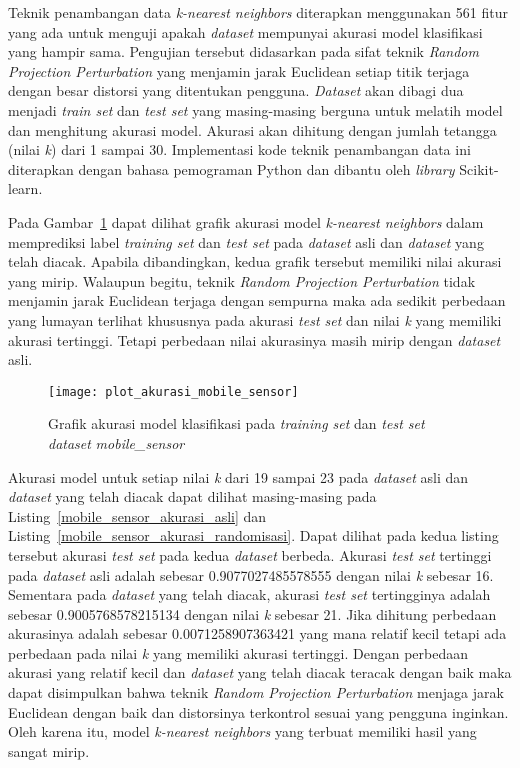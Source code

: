 Teknik penambangan data \textit{k-nearest neighbors} diterapkan menggunakan 561 fitur yang ada untuk menguji apakah \textit{dataset} mempunyai akurasi model klasifikasi yang hampir sama. Pengujian tersebut didasarkan pada sifat teknik \textit{Random Projection Perturbation} yang menjamin jarak Euclidean setiap titik terjaga dengan besar distorsi yang ditentukan pengguna. \textit{Dataset} akan dibagi dua menjadi \textit{train set} dan \textit{test set} yang masing-masing berguna untuk melatih model dan menghitung akurasi model. Akurasi akan dihitung dengan jumlah tetangga (nilai \textit{k}) dari 1 sampai 30. Implementasi kode teknik penambangan data ini diterapkan dengan bahasa pemograman Python dan dibantu oleh \textit{library} Scikit-learn.

Pada Gambar~\ref{fig:plot_akurasi_mobile_sensor} dapat dilihat grafik akurasi model \textit{k-nearest neighbors} dalam memprediksi label \textit{training set} dan \textit{test set} pada \textit{dataset} asli dan \textit{dataset} yang telah diacak. Apabila dibandingkan, kedua grafik tersebut memiliki nilai akurasi yang mirip. Walaupun begitu, teknik \textit{Random Projection Perturbation} tidak menjamin jarak Euclidean terjaga dengan sempurna maka ada sedikit perbedaan yang lumayan terlihat khususnya pada akurasi \textit{test set} dan nilai \textit{k} yang memiliki akurasi tertinggi. Tetapi perbedaan nilai akurasinya masih mirip dengan \textit{dataset} asli. 
	
\begin{figure}
	\centering
	\texttt{[image: plot\_akurasi\_mobile\_sensor]}
	\caption{Grafik akurasi model klasifikasi pada \textit{training set} dan \textit{test set} \textit{dataset} \textit{mobile\_sensor}}
	\label{fig:plot_akurasi_mobile_sensor}
\end{figure}

Akurasi model untuk setiap nilai \textit{k} dari 19 sampai 23 pada \textit{dataset} asli dan \textit{dataset} yang telah diacak dapat dilihat masing-masing pada Listing~\ref{mobile_sensor_akurasi_asli} dan Listing~\ref{mobile_sensor_akurasi_randomisasi}. Dapat dilihat pada kedua listing tersebut akurasi \textit{test set} pada kedua \textit{dataset} berbeda. Akurasi \textit{test set} tertinggi pada \textit{dataset} asli adalah sebesar 0.9077027485578555 dengan nilai \textit{k} sebesar 16. Sementara pada \textit{dataset} yang telah diacak, akurasi \textit{test set} tertingginya adalah sebesar 0.9005768578215134 dengan nilai \textit{k} sebesar 21. Jika dihitung perbedaan akurasinya adalah sebesar 0.0071258907363421 yang mana relatif kecil tetapi ada perbedaan pada nilai \textit{k} yang memiliki akurasi tertinggi. Dengan perbedaan akurasi yang relatif kecil dan \textit{dataset} yang telah diacak teracak dengan baik maka dapat disimpulkan bahwa teknik \textit{Random Projection Perturbation} menjaga jarak Euclidean dengan baik dan distorsinya terkontrol sesuai yang pengguna inginkan. Oleh karena itu, model \textit{k-nearest neighbors} yang terbuat memiliki hasil yang sangat mirip.
	
